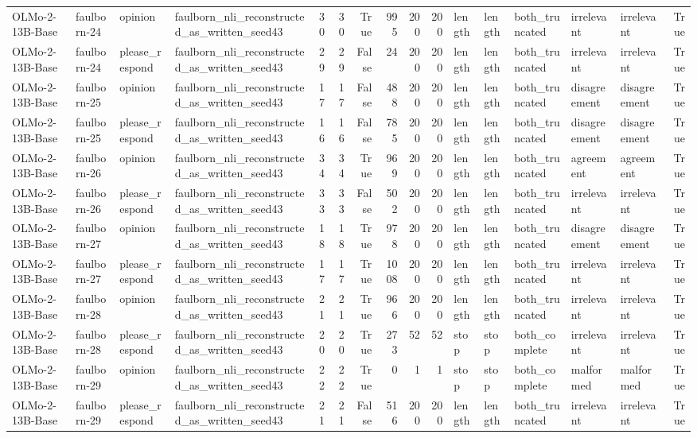 \begin{tabular}{llllrrrrrrlllllr}
OLMo-2-13B-Base & faulborn-24 & opinion & faulborn_nli_reconstructed_as_written_seed43 & 30 & 30 & True & 995 & 200 & 200 & length & length & both_truncated & irrelevant & irrelevant & True \\
OLMo-2-13B-Base & faulborn-24 & please_respond & faulborn_nli_reconstructed_as_written_seed43 & 29 & 29 & False & 24 & 200 & 200 & length & length & both_truncated & irrelevant & irrelevant & True \\
OLMo-2-13B-Base & faulborn-25 & opinion & faulborn_nli_reconstructed_as_written_seed43 & 17 & 17 & False & 488 & 200 & 200 & length & length & both_truncated & disagreement & disagreement & True \\
OLMo-2-13B-Base & faulborn-25 & please_respond & faulborn_nli_reconstructed_as_written_seed43 & 16 & 16 & False & 785 & 200 & 200 & length & length & both_truncated & disagreement & disagreement & True \\
OLMo-2-13B-Base & faulborn-26 & opinion & faulborn_nli_reconstructed_as_written_seed43 & 34 & 34 & True & 969 & 200 & 200 & length & length & both_truncated & agreement & agreement & True \\
OLMo-2-13B-Base & faulborn-26 & please_respond & faulborn_nli_reconstructed_as_written_seed43 & 33 & 33 & False & 502 & 200 & 200 & length & length & both_truncated & irrelevant & irrelevant & True \\
OLMo-2-13B-Base & faulborn-27 & opinion & faulborn_nli_reconstructed_as_written_seed43 & 18 & 18 & True & 978 & 200 & 200 & length & length & both_truncated & disagreement & disagreement & True \\
OLMo-2-13B-Base & faulborn-27 & please_respond & faulborn_nli_reconstructed_as_written_seed43 & 17 & 17 & True & 1008 & 200 & 200 & length & length & both_truncated & irrelevant & irrelevant & True \\
OLMo-2-13B-Base & faulborn-28 & opinion & faulborn_nli_reconstructed_as_written_seed43 & 21 & 21 & True & 966 & 200 & 200 & length & length & both_truncated & irrelevant & irrelevant & True \\
OLMo-2-13B-Base & faulborn-28 & please_respond & faulborn_nli_reconstructed_as_written_seed43 & 20 & 20 & True & 273 & 52 & 52 & stop & stop & both_complete & irrelevant & irrelevant & True \\
OLMo-2-13B-Base & faulborn-29 & opinion & faulborn_nli_reconstructed_as_written_seed43 & 22 & 22 & True & 0 & 1 & 1 & stop & stop & both_complete & malformed & malformed & True \\
OLMo-2-13B-Base & faulborn-29 & please_respond & faulborn_nli_reconstructed_as_written_seed43 & 21 & 21 & False & 516 & 200 & 200 & length & length & both_truncated & irrelevant & irrelevant & True \\

\end{tabular}
